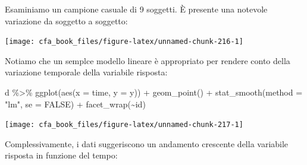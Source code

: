 \documentclass[
  11pt,
]{krantz}
\makeatletter
\newenvironment{Shaded}{\begin{snugshade}}{\end{snugshade}}
\newcommand{\AttributeTok}[1]{\textcolor[rgb]{0.61,0.61,0.61}{#1}}
\newcommand{\ConstantTok}[1]{\textcolor[rgb]{0,0,0}{#1}}
\newcommand{\DecValTok}[1]{\textcolor[rgb]{0.06,0.06,0.06}{#1}}
\newcommand{\FunctionTok}[1]{\textcolor[rgb]{0,0,0}{#1}}
\newcommand{\NormalTok}[1]{#1}
\newcommand{\OtherTok}[1]{\textcolor[rgb]{0.37,0.37,0.37}{#1}}
\newcommand{\SpecialCharTok}[1]{\textcolor[rgb]{0,0,0}{#1}}
\newcommand{\StringTok}[1]{\textcolor[rgb]{0.5,0.5,0.5}{#1}}
\newenvironment{kframe}{%
\medskip{}
\setlength{\fboxsep}{.8em}
 \def\at@end@of@kframe{}%
 \ifinner\ifhmode%
  \def\at@end@of@kframe{\end{minipage}}%
  \begin{minipage}{\columnwidth}%
 \fi\fi%
 \def\FrameCommand##1{\hskip\@totalleftmargin \hskip-\fboxsep
 \colorbox{shadecolor}{##1}\hskip-\fboxsep
     \hskip-\linewidth \hskip-\@totalleftmargin \hskip\columnwidth}%
 \MakeFramed {\advance\hsize-\width
   \@totalleftmargin\z@ \linewidth\hsize
   \@setminipage}}%
 {\par\unskip\endMakeFramed%
 \at@end@of@kframe}
\renewenvironment{Shaded}{\begin{kframe}}{\end{kframe}}
\theoremstyle{definition}
\theoremstyle{definition}
\theoremstyle{definition}
\theoremstyle{definition}
\theoremstyle{remark}
\makeatother
\begin{document}
Esaminiamo un campione casuale di 9 soggetti. È presente una notevole variazione da soggetto a soggetto:

\begin{Shaded}
\end{Shaded}

\begin{center}\texttt{[image: cfa\_book\_files/figure-latex/unnamed-chunk-216-1]} \end{center}

Notiamo che un semplce modello lineare è appropriato per rendere conto della variazione temporale della variabile risposta:

\begin{Shaded}
\begin{Highlighting}[]
\NormalTok{d }\SpecialCharTok{\%\textgreater{}\%}
  \FunctionTok{ggplot}\NormalTok{(}\FunctionTok{aes}\NormalTok{(}\AttributeTok{x =}\NormalTok{ time, }\AttributeTok{y =}\NormalTok{ y)) }\SpecialCharTok{+}
  \FunctionTok{geom\_point}\NormalTok{() }\SpecialCharTok{+}
  \FunctionTok{stat\_smooth}\NormalTok{(}\AttributeTok{method =} \StringTok{"lm"}\NormalTok{, }\AttributeTok{se =} \ConstantTok{FALSE}\NormalTok{) }\SpecialCharTok{+}
  \FunctionTok{facet\_wrap}\NormalTok{(}\SpecialCharTok{\textasciitilde{}}\NormalTok{id)}
\end{Highlighting}
\end{Shaded}

\begin{center}\texttt{[image: cfa\_book\_files/figure-latex/unnamed-chunk-217-1]} \end{center}

Complessivamente, i dati suggeriscono un andamento crescente della variabile risposta in funzione del tempo:
\end{document}
